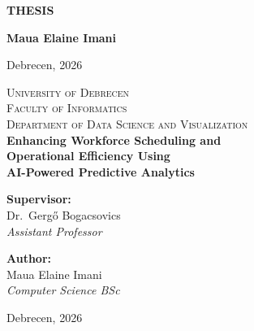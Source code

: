 \documentclass[12pt,a4paper,oneside]{article}
\begin{document}
\begin{titlepage}
\thispagestyle{empty}
\null\vfill
\begin{center}
{\fontsize{18}{24}\selectfont\bfseries THESIS}
\end{center}
\vfill
\hfill
\begin{minipage}[t]{0.4\textwidth}
\raggedleft
\textbf{Maua Elaine Imani}
\end{minipage}
\vfill\vfill
\begin{center}{\large Debrecen, 2026}\end{center}
\vspace{1cm}
\end{titlepage}

\newpage

\begin{titlepage}
\thispagestyle{empty}
\begin{center}
{\Large\scshape University of Debrecen}\\[0.3cm]
{\large\scshape Faculty of Informatics}\\[0.2cm]
{\scshape Department of Data Science and Visualization}\\[1.8cm]
{\fontsize{16}{20}\selectfont\bfseries
Enhancing Workforce Scheduling and\\[0.3cm]
Operational Efficiency Using\\[0.3cm]
AI-Powered Predictive Analytics}
\end{center}
\vspace{6.8cm}
\begin{minipage}[t]{0.48\textwidth}
\begin{flushleft}
\textbf{Supervisor:}\\[0.2cm]
Dr.~Gerg\H{o} Bogacsovics\\
\textit{Assistant Professor}
\end{flushleft}
\end{minipage}
\hfill
\begin{minipage}[t]{0.48\textwidth}
\begin{flushright}
\textbf{Author:}\\[0.2cm]
Maua Elaine Imani\\
\textit{Computer Science BSc}
\end{flushright}
\end{minipage}
\vspace{1.8cm}

\begin{center}
\end{center}

\vfill

\begin{center}
{\large Debrecen, 2026}
\end{center}

\end{titlepage}
\end{document}
